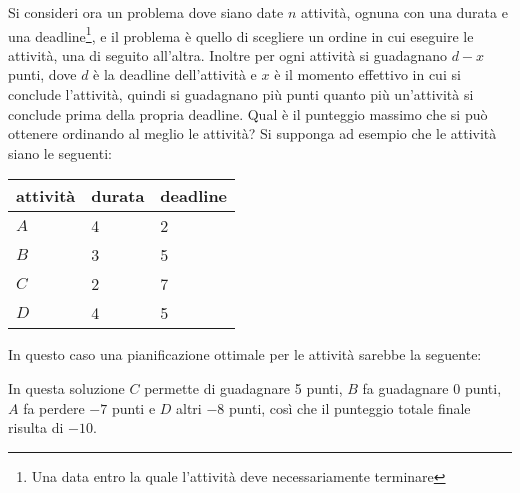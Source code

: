 Si consideri ora un problema dove siano 
date $n$ attività, ognuna con una durata e una deadline\footnote{Una data entro la quale
l'attività deve necessariamente terminare}, e il problema 
è quello di scegliere un ordine in cui eseguire le attività, una di seguito all'altra.
Inoltre per ogni attività si guadagnano $d-x$ punti,
dove $d$ è la deadline dell'attività e 
$x$ è il momento effettivo in cui si conclude l'attività,
quindi si guadagnano più punti quanto più un'attività si conclude
prima della propria deadline.
Qual è il punteggio massimo che si può ottenere 
ordinando al meglio le attività?
Si supponga ad esempio che le attività siano le seguenti:
\begin{center}
\begin{tabular}{lll}
attività & durata & deadline \\
\hline
$A$ & 4 & 2 \\
$B$ & 3 & 5 \\
$C$ & 2 & 7 \\
$D$ & 4 & 5 \\
\end{tabular}
\end{center}
In questo caso una pianificazione ottimale per le attività 
sarebbe la seguente:
\begin{center}
\end{center}
In questa soluzione $C$ permette di guadagnare 5 punti,
$B$ fa guadagnare 0 punti, $A$ fa perdere $-7$ punti
e $D$ altri $-8$ punti,
così che il punteggio totale finale risulta di $-10$.

